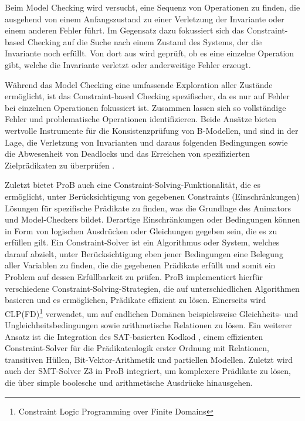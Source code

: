 Beim Model Checking wird versucht, eine Sequenz von Operationen zu finden, die ausgehend von einem Anfangszustand
zu einer Verletzung der Invariante oder einem anderen Fehler führt.
Im Gegensatz dazu fokussiert sich das Constraint-based Checking auf die Suche nach einem Zustand des Systems,
der die Invariante noch erfüllt. Von dort aus wird geprüft, ob es eine einzelne Operation gibt,
welche die Invariante verletzt oder anderweitige Fehler erzeugt.

Während das Model Checking eine umfassende Exploration aller Zustände ermöglicht, ist das Constraint-based Checking spezifischer,
da es nur auf Fehler bei einzelnen Operationen fokussiert ist.
Zusammen lassen sich so vollständige Fehler und problematische Operationen identifizieren.
Beide Ansätze bieten wertvolle Instrumente für die Konsistenzprüfung von B-Modellen, und sind in der Lage, die Verletzung von Invarianten und daraus folgenden Bedingungen sowie
die Abwesenheit von Deadlocks und das Erreichen von spezifizierten Zielprädikaten zu überprüfen \cite{leuschel2008prob}.

Zuletzt bietet ProB auch eine Constraint-Solving-Funktionalität, die es ermöglicht, unter Berücksichtigung von gegebenen Constraints (Einschränkungen) Lösungen für spezifische Prädikate zu finden,
was die Grundlage des Animators und Model-Checkers bildet.
Derartige Einschränkungen oder Bedingungen können in Form von logischen Ausdrücken oder Gleichungen gegeben sein, die es zu erfüllen gilt.
Ein Constraint-Solver ist ein Algorithmus oder System, welches darauf abzielt, unter Berücksichtigung eben jener Bedingungen eine Belegung aller Variablen zu finden, die die gegebenen Prädikate erfüllt
und somit ein Problem auf dessen Erfüllbarkeit zu prüfen.
ProB implementiert hierfür verschiedene Constraint-Solving-Strategien, die auf unterschiedlichen Algorithmen basieren und es ermöglichen, Prädikate effizient zu lösen.
Einerseits wird CLP(FD)\footnote{Constraint Logic Programming over Finite Domains} \cite{codognet1996compiling} verwendet, um auf endlichen Domänen beispielsweise Gleichheits- und Ungleichheitsbedingungen sowie arithmetische Relationen zu lösen.
Ein weiterer Ansatz ist die Integration des SAT-basierten Kodkod \cite{torlak2007kodkod},
einem effizienten Constraint-Solver für die Prädikatenlogik erster Ordnung mit Relationen, transitiven Hüllen, Bit-Vektor-Arithmetik und partiellen Modellen.
Zuletzt wird auch der SMT-Solver Z3 in ProB integriert, um komplexere Prädikate zu lösen, die über simple boolesche und arithmetische Ausdrücke hinausgehen.

